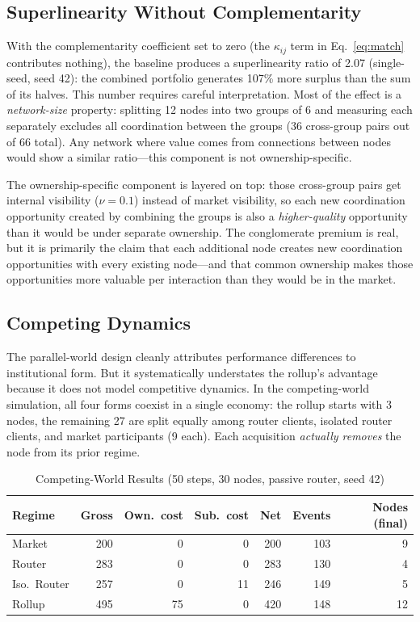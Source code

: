\documentclass[12pt]{article}
\theoremstyle{definition}
\begin{document}
\subsection{Superlinearity Without Complementarity}
\label{sec:superlinearity}

With the complementarity coefficient set to zero (the $\kappa_{ij}$ term in Eq.~\ref{eq:match} contributes nothing), the baseline produces a superlinearity ratio of 2.07 (single-seed, seed 42): the combined portfolio generates 107\% more surplus than the sum of its halves. This number requires careful interpretation. Most of the effect is a \textit{network-size} property: splitting 12 nodes into two groups of 6 and measuring each separately excludes all coordination between the groups (36 cross-group pairs out of 66 total). Any network where value comes from connections between nodes would show a similar ratio---this component is not ownership-specific.

The ownership-specific component is layered on top: those cross-group pairs get internal visibility ($\nu = 0.1$) instead of market visibility, so each new coordination opportunity created by combining the groups is also a \textit{higher-quality} opportunity than it would be under separate ownership. The conglomerate premium is real, but it is primarily the claim that each additional node creates new coordination opportunities with every existing node---and that common ownership makes those opportunities more valuable per interaction than they would be in the market.

\subsection{Competing Dynamics}
\label{sec:competing}

The parallel-world design cleanly attributes performance differences to institutional form. But it systematically understates the rollup's advantage because it does not model competitive dynamics. In the competing-world simulation, all four forms coexist in a single economy: the rollup starts with 3 nodes, the remaining 27 are split equally among router clients, isolated router clients, and market participants (9 each). Each acquisition \textit{actually removes} the node from its prior regime.

\begin{table}[H]
\centering
\caption{Competing-World Results (50 steps, 30 nodes, passive router, seed 42)}
\label{tab:competing}
\begin{tabular}{lrrrrrr}
\toprule
Regime & Gross & Own.\ cost & Sub.\ cost & Net & Events & Nodes (final) \\
\midrule
Market & 200 & 0 & 0 & 200 & 103 & 9 \\
Router & 283 & 0 & 0 & 283 & 130 & 4 \\
Iso.\ Router & 257 & 0 & 11 & 246 & 149 & 5 \\
Rollup & 495 & 75 & 0 & 420 & 148 & 12 \\
\bottomrule
\end{tabular}
\end{table}
\end{document}
